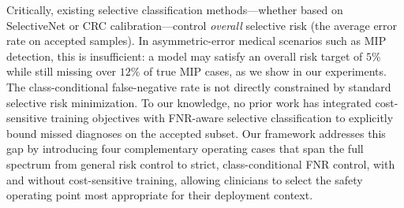 Critically, existing selective classification methods---whether based on SelectiveNet or CRC calibration---control \emph{overall} selective risk (the average error rate on accepted samples). In asymmetric-error medical scenarios such as MIP detection, this is insufficient: a model may satisfy an overall risk target of $5\%$ while still missing over $12\%$ of true MIP cases, as we show in our experiments. The class-conditional false-negative rate is not directly constrained by standard selective risk minimization. To our knowledge, no prior work has integrated cost-sensitive training objectives with FNR-aware selective classification to explicitly bound missed diagnoses on the accepted subset. Our framework addresses this gap by introducing four complementary operating cases that span the full spectrum from general risk control to strict, class-conditional FNR control, with and without cost-sensitive training, allowing clinicians to select the safety operating point most appropriate for their deployment context.
